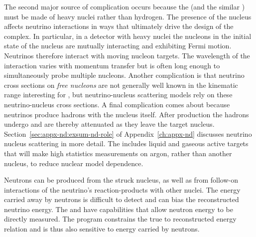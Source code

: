 The second major source of complication occurs because the  (and the similar ) must be made of heavy nuclei rather than hydrogen. %
The presence of the nucleus affects %
neutrino interactions in ways that ultimately drive the design of the   complex. In particular, in a detector with heavy nuclei the nucleons in the initial state of the nucleus are mutually interacting and exhibiting Fermi motion. Neutrinos therefore interact with moving nucleon targets. The wavelength of the interaction varies with momentum transfer but is often long enough to simultaneously probe multiple nucleons. Another complication is that neutrino cross sections on {\em free nucleons} are not generally well known in the kinematic range interesting for , but neutrino-nucleus scattering models rely on these neutrino-nucleus cross sections. A final complication comes about because neutrinos produce hadrons with the nucleus itself. After production the hadrons undergo  and are thereby attenuated as they leave the target nucleus. Section~\ref{sec:appx-nd:exsum-nd-role} of Appendix~\ref{ch:appx-nd} discusses neutrino nucleus scattering in more detail. The   includes liquid and gaseous active targets that will make high statistics measurements on argon, rather than another nucleus, to reduce nuclear model dependence. 


Neutrons can be produced from the struck nucleus, as well as from follow-on interactions of the neutrino's reaction-products with other nuclei. The energy carried away by neutrons is difficult to detect and can bias the reconstructed neutrino energy. The  and  have capabilities that allow neutron energy to be directly measured. The  program constrains the true to reconstructed energy relation and is thus also sensitive to energy carried by neutrons.


